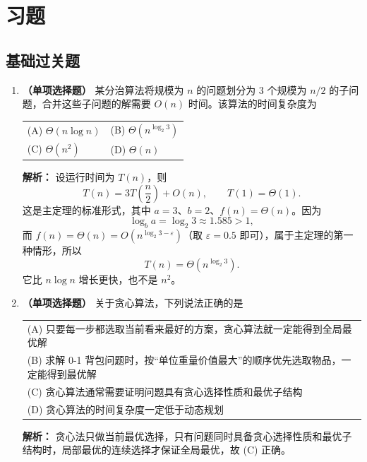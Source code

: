 \section{习题}

\subsection{基础过关题}

\begin{enumerate}

\item \textbf{（单项选择题）} 某分治算法将规模为 $n$ 的问题划分为 $3$ 个规模为 $n/2$ 的子问题，合并这些子问题的解需要 $O(n)$ 时间。该算法的时间复杂度为
\begin{center}
\begin{tabular}{ll}
(A) $\Theta(n\log n)$ & (B) $\Theta\!\left(n^{\log_2 3}\right)$ \\[6pt]
(C) $\Theta(n^2)$ & (D) $\Theta(n)$
\end{tabular}
\end{center}

\ifshowsolutions\par\noindent\textbf{解析：} 设运行时间为 $T(n)$，则
\[
T(n)=3T\!\left(\frac n2\right)+O(n),\qquad T(1)=\Theta(1).
\]
这是主定理的标准形式，其中 $a=3$、$b=2$、$f(n)=\Theta(n)$。因为
\[
\log_b a=\log_2 3\approx 1.585>1,
\]
而 $f(n)=\Theta(n)=O\!\left(n^{\log_2 3-\varepsilon}\right)$（取 $\varepsilon=0.5$ 即可），属于主定理的第一种情形，所以
\[
T(n)=\Theta\!\left(n^{\log_2 3}\right).
\]
它比 $n\log n$ 增长更快，也不是 $n^2$。\else \answerarea \fi

\item \textbf{（单项选择题）} 关于贪心算法，下列说法正确的是
\begin{center}
\begin{tabularx}{0.96\linewidth}{@{}X@{}}
(A) 只要每一步都选取当前看来最好的方案，贪心算法就一定能得到全局最优解 \\[4pt]
(B) 求解 0-1 背包问题时，按“单位重量价值最大”的顺序优先选取物品，一定能得到最优解 \\[4pt]
(C) 贪心算法通常需要证明问题具有贪心选择性质和最优子结构 \\[4pt]
(D) 贪心算法的时间复杂度一定低于动态规划
\end{tabularx}
\end{center}

\ifshowsolutions\par\noindent\textbf{解析：} 贪心法只做当前最优选择，只有问题同时具备贪心选择性质和最优子结构时，局部最优的连续选择才保证全局最优，故 (C) 正确。


\end{enumerate}
